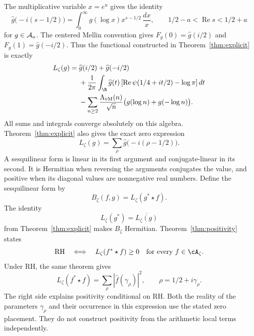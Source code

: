 The multiplicative variable $x=e^u$ gives the identity
\begin{equation}
 \widehat g\bigl(-i(s-1/2)\bigr)
 =\int_0^\infty g(\log x)x^{s-1/2}\,\frac{dx}{x},
 \qquad 1/2-a<\operatorname{Re}s<1/2+a
 \label{eq:mellin}
\end{equation}
for $g\in\mathcal A_a$.
The centered Mellin convention gives
$F_g(0)=\widehat g(i/2)$ and $F_g(1)=\widehat g(-i/2)$.
Thus the functional constructed in Theorem~\ref{thm:explicit} is exactly
\begin{equation}
\begin{split}
 L_\zeta(g)={}&\widehat g(i/2)+\widehat g(-i/2)\\
 &+\frac1{2\pi}\int_{\R}\widehat g(t)
   \left[\operatorname{Re}\psi(1/4+it/2)-\log\pi\right]dt\\
 &-\sum_{n\geq2}\frac{\Lambda_{\mathrm{vM}}(n)}{\sqrt n}
                 \bigl(g(\log n)+g(-\log n)\bigr).
\end{split}
\label{eq:weil-functional}
\end{equation}
All sums and integrals converge absolutely on this algebra.
Theorem~\ref{thm:explicit} also gives the exact zero expression
\begin{equation}
 L_\zeta(g)=\sum_\rho\widehat g\bigl(-i(\rho-1/2)\bigr).
 \label{eq:explicit}
\end{equation}
A sesquilinear form is linear in its first argument and conjugate-linear in
its second.  It is Hermitian when reversing the arguments conjugates the
value, and positive when its diagonal values are nonnegative real numbers.
Define the sesquilinear form by
\[
 B_\zeta(f,g)=L_\zeta(g^*\star f).
\]
The identity
\begin{equation}
 L_\zeta(g^*)=\overline{L_\zeta(g)}
 \label{eq:hermitian}
\end{equation}
from Theorem~\ref{thm:explicit} makes $B_\zeta$ Hermitian.
Theorem~\ref{thm:positivity} states
\begin{equation}
 \mathrm{RH}\quad\Longleftrightarrow\quad
 L_\zeta(f^*\star f)\geq0\quad\hbox{for every }f\in\cA_\zeta.
 \label{eq:weil-criterion}
\end{equation}
Under RH, the same theorem gives
\begin{equation}
 L_\zeta(f^*\star f)=\sum_\rho|\widehat f(\gamma_\rho)|^2,
 \qquad \rho=1/2+i\gamma_\rho.
 \label{eq:zero-norm}
\end{equation}
The right side explains positivity conditional on RH.  Both the reality
of the parameters $\gamma_\rho$ and their occurrence in this expression
use the stated zero placement.  They do not construct positivity from the
arithmetic local terms independently.

